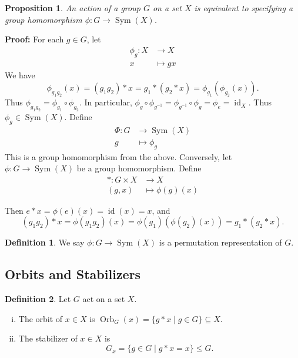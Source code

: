 \documentclass[12pt]{article}
\DeclareMathOperator{\id}{id}
\DeclareMathOperator{\Sym}{Sym}
\DeclareMathOperator{\Orb}{Orb}
\newtheorem{proposition}{Proposition}[section]
\theoremstyle{definition}
\newtheorem{definition}{Definition}[section]
\theoremstyle{remark}
\begin{document}
\begin{proposition}
	An action of a group $G$ on a set $X$ is equivalent to specifying a group homomorphism $\phi : G \to \Sym(X)$.
\end{proposition}

\begin{adjustbox}{minipage = \columnwidth - 25.5pt, margin=1em, frame=1pt, margin=0em}
\textbf{Proof:} For each $g \in G$, let
\begin{align*}
	\phi_g : X &\to X \\
	x &\mapsto gx
\end{align*}
We have
\[
\phi_{g_1g_2}(x) = (g_1g_2) \ast x = g_1 \ast (g_2 \ast x) = \phi_{g_1} (\phi_{g_2} (x)).
\]
Thus $\phi_{g_1g_2} = \phi_{g_1} \circ \phi_{g_2}$. In particular, $\phi_{g} \circ \phi_{g^{-1}} = \phi_{g^{-1}} \circ \phi_{g} = \phi_{e} = \id_{X}$. Thus $\phi_g \in \Sym(X)$. Define
\begin{align*}
	\Phi : G &\to \Sym(X) \\
	g &\mapsto \phi_g
\end{align*}
This is a group homomorphism from the above. Conversely, let $\phi : G \to \Sym(X)$ be a group homomorphism. Define
\begin{align*}
	\ast : G \times X &\to X \\
	(g, x) &\mapsto \phi(g)(x)
\end{align*}
\end{adjustbox}

\begin{adjustbox}{minipage = \columnwidth - 25.5pt, margin=1em, frame=1pt, margin=0em}
Then $e \ast x = \phi(e)(x) = \id(x) = x$, and
\[
	(g_1 g_2) \ast x = \phi(g_1g_2)(x) = \phi(g_1)(\phi(g_2)(x)) = g_1 \ast (g_2 \ast x)
.\]
\end{adjustbox}


\begin{definition}
	We say $\phi : G \to \Sym(X)$ is a permutation representation of $G$.
\end{definition}

\subsection{Orbits and Stabilizers}%
\label{sub:orbits_and_stabilizers}

\begin{definition}
	Let $G$ act on a set $X$.
	\begin{enumerate}[(i)]
		\item The orbit of $x \in X$ is $\Orb_{G}(x) = \{g \ast x \mid g \in G\} \subseteq X$.
		\item The stabilizer of $x \in X$ is
			\[
				G_x = \{g \in G \mid g \ast x = x\} \leq G
			.\]
	\end{enumerate}
\end{definition}
\end{document}

